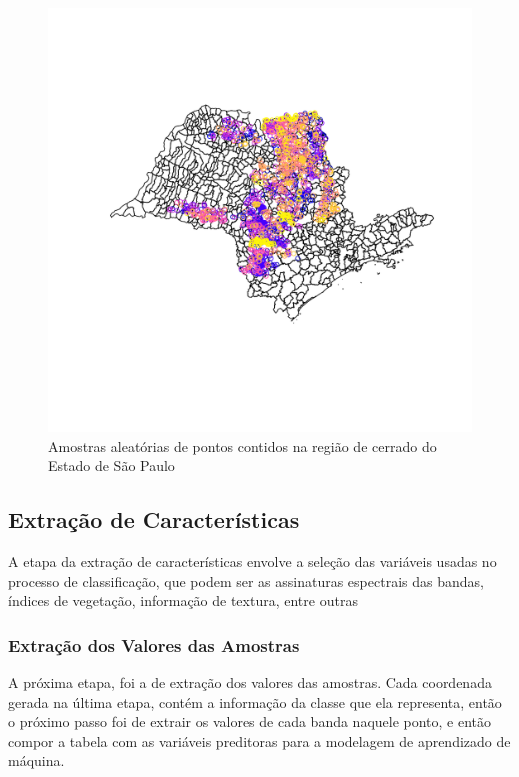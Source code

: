 \begin{figure}[H]
    \label{fig-amostras}
    \centering
    \caption{Amostras aleatórias de pontos contidos na região de cerrado do Estado de São Paulo}
    \includegraphics[scale=0.6]{figs/plot_pontos-amostra.pdf}
\end{figure}

\subsection{Extração de
Características}\label{extracao-de-caracteristicas}

	A etapa da extração de características envolve a seleção das variáveis
usadas no processo de classificação, que podem ser as assinaturas
espectrais das bandas, índices de vegetação, informação de textura,
entre outras \cite{lu-weng}

\subsubsection{Extração dos Valores das
Amostras}\label{extracao-dos-valores-das-amostras}

    A próxima etapa, foi a de extração dos valores das amostras. Cada
coordenada gerada na última etapa, contém a informação da classe que ela representa, então o próximo passo foi de extrair os valores de cada
banda naquele ponto, e então compor a tabela com as variáveis preditoras
para a modelagem de aprendizado de máquina.

